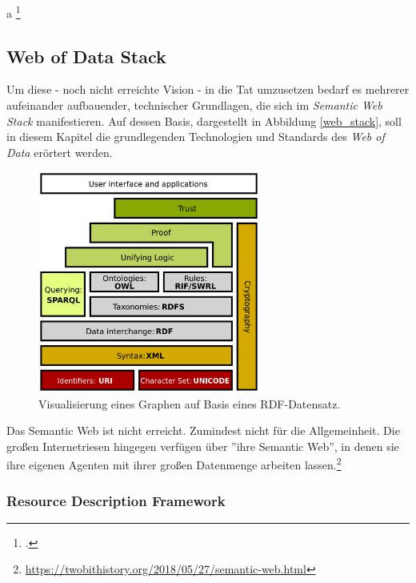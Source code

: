 \documentclass[12pt,a4paper]{article}
\begin{document}
a
\footcite[S.1-6]{pellegrini2006semantic}


\subsection{Web of Data Stack}

Um diese - noch nicht erreichte Vision - in die Tat umzusetzen bedarf es mehrerer aufeinander aufbauender, technischer Grundlagen, die sich im \textit{Semantic Web Stack} manifestieren. Auf dessen Basis, dargestellt in Abbildung \ref{web_stack}, soll in diesem Kapitel die grundlegenden Technologien und Standards des \textit{Web of Data} erörtert werden.
\begin{figure}[h]
  \centering
	\includegraphics[width=0.65\textwidth]{img/web_stack.png}  
    \caption[Visualisierung eines Graphen auf Basis eines RDF-Datensatz, \protect\url{https://www.w3.org/TR/rdf11-primer/}, 10.04.2019.]{Visualisierung eines Graphen auf Basis eines RDF-Datensatz.}
  	\label{fig:web_stack}
\end{figure}

Das Semantic Web ist nicht erreicht. Zumindest nicht für die Allgemeinheit. Die großen Internetriesen hingegen verfügen über ''ihre Semantic Web'', in denen sie ihre eigenen Agenten mit ihrer großen Datenmenge arbeiten lassen.\footnote{\url{https://twobithistory.org/2018/05/27/semantic-web.html}}




\subsubsection{Resource Description Framework}
\end{document}
